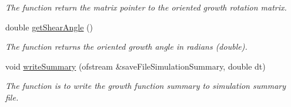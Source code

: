 \begin{DoxyCompactItemize}
\begin{DoxyCompactList}\small\item\em The function return the matrix pointer to the oriented growth rotation matrix. \end{DoxyCompactList}\item 
\hypertarget{classUniformGrowthFunction_a8a60d83743c441f7453af8053d5e7010}{}double \hyperlink{classUniformGrowthFunction_a8a60d83743c441f7453af8053d5e7010}{get\+Shear\+Angle} ()\label{classUniformGrowthFunction_a8a60d83743c441f7453af8053d5e7010}

\begin{DoxyCompactList}\small\item\em The function returns the oriented growth angle in radians (double). \end{DoxyCompactList}\item 
void \hyperlink{classUniformGrowthFunction_a227ffb3a524779628f98f110d3811399}{write\+Summary} (ofstream \&save\+File\+Simulation\+Summary, double dt)
\begin{DoxyCompactList}\small\item\em The function is to write the growth function summary to simulation summary file. \end{DoxyCompactList}\end{DoxyCompactItemize}
